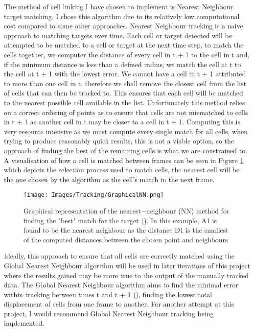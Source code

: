 \documentclass[12pt a4paper]{article}
\begin{document}
The method of cell linking I have chosen to implement is Nearest Neighbour target matching. I chose this algorithm due to its relatively low computational cost compared to some other approaches. 
Nearest Neighbour tracking is a naive approach to matching targets over time. Each cell or target detected will be attempted to be matched to a cell or target at the next time step, to match the cells together, we computer the distance of every cell in t + 1 to the cell in t and, if the minimum distance is less than a defined radius, we match the cell at t to the cell at t + 1 with the lowest error. We cannot have a cell in t + 1 attributed to more than one cell in t, therefore we shall remove the closest cell from the list of cells that can then be tracked to. This ensures that each cell will be matched to the nearest possible cell available in the list. Unfortunately this method relies on a correct ordering of points as to ensure that cells are not mismatched to cells in t + 1 as another cell in t may be closer to a cell in t + 1. Computing this is very resource intensive as we must compute every single match for all cells, when trying to produce reasonably quick results, this is not a viable option, so the approach of finding the best of the remaining cells is what we are constrained to. A visualisation of how a cell is matched between frames can be seen in  Figure \ref{fig:nn} which depicts the selection process used to match cells, the nearest cell will be the one chosen by the algorithm as the cell's match in the next frame.

\begin{figure}
    \centering
    \texttt{[image: Images/Tracking/GraphicalNN.png]}
    \caption{Graphical representation of the nearest−neighbour (NN) method for finding the "best" match for the target (\cite{DNN}). In this example, A1 is found to be the nearest neighbour as the distance D1 is the smallest of the computed distances between the chosen point and neighbours}
    \label{fig:nn}
\end{figure}
Ideally, this approach to ensure that all cells are correctly matched using the Global Nearest Neighbour algorithm will be used in later iterations of this project where the results gained may be more true to the output of the manually tracked data. The Global Nearest Neighbour algorithm aims to find the minimal error within tracking between times t and t + 1 (\cite{konstantinova2003study}), finding the lowest total displacement of cells from one frame to another. For another attempt at this project, I would recommend Global Nearest Neighbour tracking being implemented.
\end{document}
